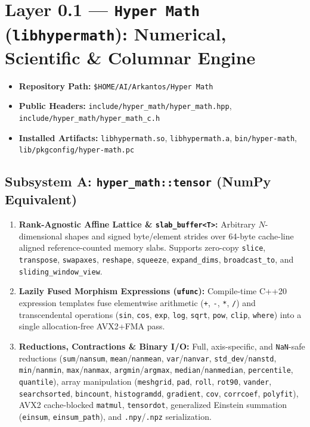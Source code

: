 \documentclass[11pt,a4paper]{article}
\begin{document}
\section{Layer 0.1 --- \texttt{Hyper Math} (\texttt{libhypermath}): Numerical, Scientific \& Columnar Engine}

\begin{itemize}[leftmargin=1.5em,itemsep=1pt]
  \item \textbf{Repository Path:} \texttt{\$HOME/AI/Arkantos/Hyper Math}
  \item \textbf{Public Headers:} \texttt{include/hyper\_math/hyper\_math.hpp}, \texttt{include/hyper\_math/hyper\_math\_c.h}
  \item \textbf{Installed Artifacts:} \texttt{libhypermath.so}, \texttt{libhypermath.a}, \texttt{bin/hyper-math}, \texttt{lib/pkgconfig/hyper-math.pc}
\end{itemize}

\subsection{Subsystem A: \texttt{hyper\_math::tensor} (NumPy Equivalent)}
\begin{enumerate}[leftmargin=1.5em]
  \item \textbf{Rank-Agnostic Affine Lattice \& \texttt{slab\_buffer<T>}:} Arbitrary $N$-dimensional shapes and signed byte/element strides over 64-byte cache-line aligned reference-counted memory slabs. Supports zero-copy \texttt{slice}, \texttt{transpose}, \texttt{swapaxes}, \texttt{reshape}, \texttt{squeeze}, \texttt{expand\_dims}, \texttt{broadcast\_to}, and \texttt{sliding\_window\_view}.
  \item \textbf{Lazily Fused Morphism Expressions (\texttt{ufunc}):} Compile-time C++20 expression templates fuse elementwise arithmetic (\texttt{+}, \texttt{-}, \texttt{*}, \texttt{/}) and transcendental operations (\texttt{sin}, \texttt{cos}, \texttt{exp}, \texttt{log}, \texttt{sqrt}, \texttt{pow}, \texttt{clip}, \texttt{where}) into a single allocation-free AVX2+FMA pass.
  \item \textbf{Reductions, Contractions \& Binary I/O:} Full, axis-specific, and \texttt{NaN}-safe reductions (\texttt{sum}/\texttt{nansum}, \texttt{mean}/\texttt{nanmean}, \texttt{var}/\texttt{nanvar}, \texttt{std\_dev}/\texttt{nanstd}, \texttt{min}/\texttt{nanmin}, \texttt{max}/\texttt{nanmax}, \texttt{argmin}/\texttt{argmax}, \texttt{median}/\texttt{nanmedian}, \texttt{percentile}, \texttt{quantile}), array manipulation (\texttt{meshgrid}, \texttt{pad}, \texttt{roll}, \texttt{rot90}, \texttt{vander}, \texttt{searchsorted}, \texttt{bincount}, \texttt{histogramdd}, \texttt{gradient}, \texttt{cov}, \texttt{corrcoef}, \texttt{polyfit}), AVX2 cache-blocked \texttt{matmul}, \texttt{tensordot}, generalized Einstein summation (\texttt{einsum}, \texttt{einsum\_path}), and \texttt{.npy}/\texttt{.npz} serialization.
\end{enumerate}
\end{document}
